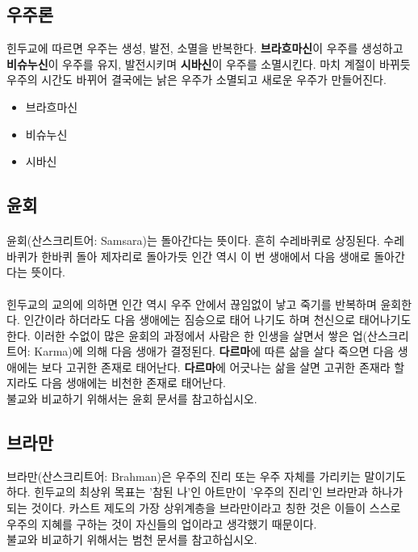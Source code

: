 \documentclass[12pt, a4paper, oneside]{book}
\begin{document}
\subsection{우주론}
힌두교에 따르면 우주는 생성, 발전, 소멸을 반복한다. 
\textbf{브라흐마신}이 우주를 생성하고 \textbf{비슈누신}이 우주를 유지, 발전시키며 \textbf{시바신}이 우주를 소멸시킨다. 
마치 계절이 바뀌듯 우주의 시간도 바뀌어 결국에는 낡은 우주가 소멸되고 새로운 우주가 만들어진다.

			\begin{itemize}[topsep=0.0em, parsep=0.0em, itemsep=0em, leftmargin=12.0em, labelwidth=3em, labelsep=3em] 
			\item 브라흐마신
			\item 비슈누신
			\item 시바신
			\end{itemize}



\subsection{윤회}
	\paragraph{}
윤회(산스크리트어: Samsara)는 돌아간다는 뜻이다. 흔히 수레바퀴로 상징된다. 
수레바퀴가 한바퀴 돌아 제자리로 돌아가듯 인간 역시 이 번 생애에서 다음 생애로 돌아간다는 뜻이다.

	\paragraph{}
힌두교의 교의에 의하면 인간 역시 우주 안에서 끊임없이 낳고 죽기를 반복하며 윤회한다. 
인간이라 하더라도 다음 생애에는 짐승으로 태어 나기도 하며 천신으로 태어나기도 한다. 
이러한 수없이 많은 윤회의 과정에서 사람은 한 인생을 살면서 쌓은 업(산스크리트어: Karma)에 의해 다음 생애가 결정된다. 
\textbf{다르마}에 따른 삶을 살다 죽으면 다음 생애에는 보다 고귀한 존재로 태어난다. 
\textbf{다르마}에 어긋나는 삶을 살면 고귀한 존재라 할지라도 다음 생애에는 비천한 존재로 태어난다.\\
불교와 비교하기 위해서는 윤회 문서를 참고하십시오.


\subsection{브라만}
브라만(산스크리트어: Brahman)은 우주의 진리 또는 우주 자체를 가리키는 말이기도 하다. 
힌두교의 최상위 목표는 '참된 나'인 아트만이 '우주의 진리'인 브라만과 하나가 되는 것이다. 
카스트 제도의 가장 상위계층을 브라만이라고 칭한 것은 이들이 스스로 우주의 지혜를 구하는 것이 자신들의 업이라고 생각했기 때문이다.\\
불교와 비교하기 위해서는 범천 문서를 참고하십시오.
\end{document}
